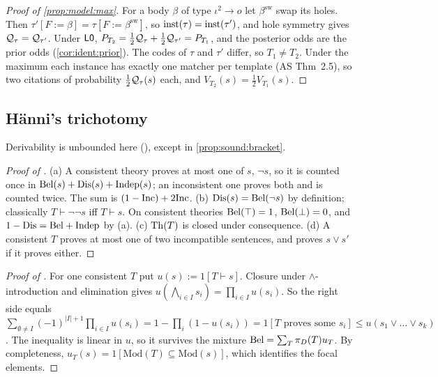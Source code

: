 \begin{proof}[Proof of \cref{prop:model:max}]
For a body $\beta$ of type $\iota^2\to o$ let $\beta^{\mathrm{sw}}$ swap its holes. Then $\tau'[F:=\beta]=\tau[F:=\beta^{\mathrm{sw}}]$, so $\mathrm{inst}(\tau)=\mathrm{inst}(\tau')$, and hole symmetry gives $\mathcal{Q}_\tau=\mathcal{Q}_{\tau'}$. Under $\mathord{\mathsf{L0}}$, $P_{T_2}=\tfrac12\mathcal{Q}_\tau+\tfrac12\mathcal{Q}_{\tau'}=P_{T_1}$, and the posterior odds are the prior odds (\cref{cor:ident:prior}). The codes of $\tau$ and $\tau'$ differ, so $T_1\ne T_2$. Under the maximum each instance has exactly one matcher per template (AS Thm~2.5), so two citations of probability $\tfrac12\mathcal{Q}_\tau(s)$ each, and $V_{T_2}(s)=\tfrac12V_{T_1}(s)$.
\end{proof}

\subsection{H\"anni's trichotomy}\label{app:sound:tri}

Derivability is unbounded here (), except in \cref{prop:sound:bracket}.

\begin{proof}[Proof of ]
(a) A consistent theory proves at most one of $s$, $\neg s$, so it is counted once in $\mathrm{Bel}(s)+\mathrm{Dis}(s)+\mathrm{Indep}(s)$; an inconsistent one proves both and is counted twice. The sum is $(1-\mathrm{Inc})+2\mathrm{Inc}$.
(b) $\mathrm{Dis}(s)=\mathrm{Bel}(\neg s)$ by definition; classically $T\vdash\neg\neg s$ iff $T\vdash s$. On consistent theories $\mathrm{Bel}(\top)=1$, $\mathrm{Bel}(\bot)=0$, and $1-\mathrm{Dis}=\mathrm{Bel}+\mathrm{Indep}$ by (a).
(c) $\mathrm{Th}(T)$ is closed under consequence.
(d) A consistent $T$ proves at most one of two incompatible sentences, and proves $s\vee s'$ if it proves either.
\end{proof}

\begin{proof}[Proof of ]
For one consistent $T$ put $u(s):=1[T\vdash s]$. Closure under $\wedge$-introduction and elimination gives $u(\bigwedge_{i\in I}s_i)=\prod_{i\in I}u(s_i)$. So the right side equals $\sum_{\emptyset\ne I}(-1)^{|I|+1}\prod_{i\in I}u(s_i)=1-\prod_i(1-u(s_i))=1[T\text{ proves some }s_i]\le u(s_1\vee\dots\vee s_k)$. The inequality is linear in $u$, so it survives the mixture $\mathrm{Bel}=\sum_T\pi_D(T)u_T$. By completeness, $u_T(s)=1[\mathrm{Mod}(T)\subseteq\mathrm{Mod}(s)]$, which identifies the focal elements.
\end{proof}

